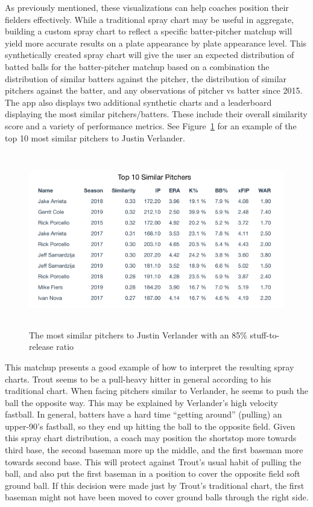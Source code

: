 \documentclass[11pt]{article}
\begin{document}
As previously mentioned, these visualizations can help coaches position their fielders effectively. While a traditional spray chart may be useful in aggregate, building a custom spray chart to reflect a specific batter-pitcher matchup will yield more accurate results on a plate appearance by plate appearance level. This synthetically created spray chart will give the user an expected distribution of batted balls for the batter-pitcher matchup based on a combination the distribution of similar batters against the pitcher, the distribution of similar pitchers against the batter, and any observations of pitcher vs batter since 2015. The app also displays two additional synthetic charts and a leaderboard displaying the most similar pitchers/batters. These include their overall similarity score and a variety of performance metrics. See Figure~\ref{synthpitcher} for an example of the top 10 most similar pitchers to Justin Verlander.

\begin{figure}
\centering
    \includegraphics[width=6in, height=3in]{verlander_similar.png}
    \caption{The most similar pitchers to Justin Verlander with an 85\% stuff-to-release ratio}
    \label{synthpitcher}
\end{figure}

This matchup presents a good example of how to interpret the resulting spray charts. Trout seems to be a pull-heavy hitter in general according to his traditional chart. When facing pitchers similar to Verlander, he seems to push the ball the opposite way. This may be explained by Verlander's high velocity fastball. In general, batters have a hard time ``getting around'' (pulling) an upper-90's fastball, so they end up hitting the ball to the opposite field. Given this spray chart distribution, a coach may position the shortstop more towards third base, the second baseman more up the middle, and the first baseman more towards second base. This will protect against Trout's usual habit of pulling the ball, and also put the first baseman in a position to cover the opposite field soft ground ball. If this decision were made just by Trout's traditional chart, the first baseman might not have been moved to cover ground balls through the right side.
\end{document}
